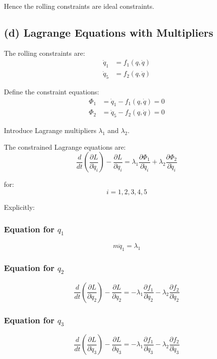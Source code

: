 Hence the rolling constraints are ideal constraints.

\subsection*{(d) Lagrange Equations with Multipliers}

The rolling constraints are:
\begin{align}
\dot q_1 &= f_1(q,\dot q)
\\
\dot q_5 &= f_2(q,\dot q)
\end{align}

Define the constraint equations:
\begin{align}
\Phi_1 &= \dot q_1 - f_1(q,\dot q)=0
\\
\Phi_2 &= \dot q_5 - f_2(q,\dot q)=0
\end{align}

Introduce Lagrange multipliers $\lambda_1$ and $\lambda_2$.

The constrained Lagrange equations are:
\[
\frac{d}{dt}
\left(
\frac{\partial L}{\partial \dot q_i}
\right)
-
\frac{\partial L}{\partial q_i}
=
\lambda_1\frac{\partial\Phi_1}{\partial\dot q_i}
+
\lambda_2\frac{\partial\Phi_2}{\partial\dot q_i}
\]

for:
\[
i = 1,2,3,4,5
\]

Explicitly:

\subsubsection*{Equation for $q_1$}

\[
m\ddot q_1 = \lambda_1
\]

\subsubsection*{Equation for $q_2$}

\[
\frac{d}{dt}\left(\frac{\partial L}{\partial\dot q_2}\right)
-
\frac{\partial L}{\partial q_2}
=
-\lambda_1\frac{\partial f_1}{\partial\dot q_2}
-
\lambda_2\frac{\partial f_2}{\partial\dot q_2}
\]

\subsubsection*{Equation for $q_3$}

\[
\frac{d}{dt}\left(\frac{\partial L}{\partial\dot q_3}\right)
-
\frac{\partial L}{\partial q_3}
=
-\lambda_1\frac{\partial f_1}{\partial\dot q_3}
-
\lambda_2\frac{\partial f_2}{\partial\dot q_3}
\]

